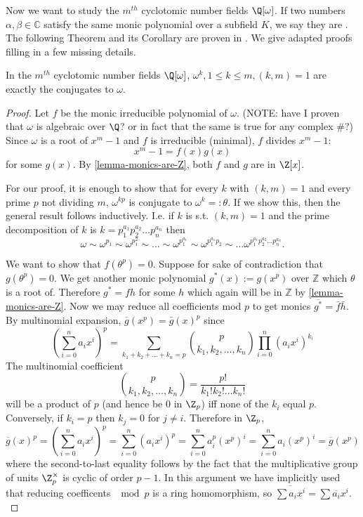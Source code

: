 Now we want to study the $m^{th}$ cyclotomic number fields $\Q[\omega]$. If two numbers $\alpha,\beta\in \mathbb{C}$ satisfy the same monic polynomial over a subfield $K$, we say they are . The following Theorem and its Corollary are proven in \cite{NumberFields}. We give adapted proofs filling in a few missing details.
\begin{theorem}\label{conjugates-of-Q[w]}
In the $m^{th}$ cyclotomic number fields $\Q[\omega]$, $\omega^k, 1\leq k\leq m, (k,m)=1$ are exactly the conjugates to $\omega$. 
\end{theorem}
\begin{proof}
Let $f$ be the monic irreducible polynomial of $\omega$. (NOTE: have I proven that $\omega$ is algebraic over $\Q$? or in fact that the same is true for any complex \#?) Since $\omega$ is a root of $x^m-1$ and $f$ is irreducible (minimal), $f$ divides $x^m-1$:
$$x^m-1=f(x)g(x)$$
for some $g(x)$. By \cref{lemma-monics-are-Z}, both $f$ and $g$ are in $\Z[x]$.

For our proof, it is enough to show that for every $k$ with $(k,m)=1$ and every prime $p$ not dividing $m$, $\omega^{kp}$ is conjugate to $\omega^k=:\theta$. If we show this, then the general result follows inductively. I.e. if $k$ is s.t. $(k,m)=1$ and the prime decomposition of $k$ is $k=p_1^{a_1}p_2^{a_2}\dots p_n^{a_n}$ then
$$\omega\sim\omega^{p_1}\sim\omega^{p_1^2}\sim\dots\sim\omega^{p_1^{a_1}}\sim\omega^{p_1^{a_1}p_2}\sim\dots \omega^{p_1^{a_1}p_2^{a_2}\dots p_n^{a_n}}.$$

We want to show that $f(\theta^p)=0$. Suppose for sake of contradiction that $g(\theta^p)=0$. We get another monic polynomial $g^*(x):=g(x^p)$ over $\mathbb{Z}$ which $\theta$ is a root of. Therefore $g^*=fh$ for some $h$ which again will be in $\mathbb{Z}$ by \cref{lemma-monics-are-Z}. Now we may reduce all coefficients mod $p$ to get monics $\overline{g^*}=\bar{f}\bar{h}$. By multinomial expansion, $\overline{g}(x^p)=\bar{g}(x)^p$ since $$(\sum_{i=0}^n a_ix^i)^p=\sum_{k_1+k_2+\dots+k_n=p}{p\choose k_1,k_2,\dots ,k_n}\prod_{i=0}^n(a_ix^i)^{k_i}$$
The multinomial coefficient $${p\choose k_1,k_2,\dots ,k_n}=\frac{p!}{k_1!k_2!\dots k_n!}$$
will be a product of $p$ (and hence be $0$ in $\Z_p$) iff none of the $k_i$ equal $p$. Conversely, if $k_i=p$ then $k_j=0$ for $j\neq i$. Therefore in $\Z_p$,
$$\overline{g}(x)^p=(\sum_{i=0}^n a_ix^i)^p=\sum_{i=0}^n(a_ix^i)^p=\sum_{i=0}^n a_i^p (x^p)^i=\sum_{i=0}^n a_i (x^p)^i=\overline{g}(x^p)$$
where the second-to-last equality follows by the fact that the multiplicative group of units $\Z_p^{\times}$ is cyclic of order $p-1$. In this argument we have implicitly used that reducing coefficents $\mod p$ is a ring homomorphism, so $\overline{\sum a_ix^i}=\sum \overline{a_i}x^i.$


\end{proof}
